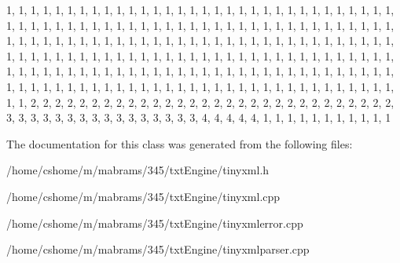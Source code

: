 \begin{DoxyCode}
 {
    
    1,  1,      1,      1,      1,      1,      1,      1,      1,      1,      
      1,       1,      1,      1,      1,      1,      
    1,  1,      1,      1,      1,      1,      1,      1,      1,      1,      
      1,       1,      1,      1,      1,      1,      
    1,  1,      1,      1,      1,      1,      1,      1,      1,      1,      
      1,       1,      1,      1,      1,      1,      
    1,  1,      1,      1,      1,      1,      1,      1,      1,      1,      
      1,       1,      1,      1,      1,      1,      
    1,  1,      1,      1,      1,      1,      1,      1,      1,      1,      
      1,       1,      1,      1,      1,      1,      
    1,  1,      1,      1,      1,      1,      1,      1,      1,      1,      
      1,       1,      1,      1,      1,      1,      
    1,  1,      1,      1,      1,      1,      1,      1,      1,      1,      
      1,       1,      1,      1,      1,      1,      
    1,  1,      1,      1,      1,      1,      1,      1,      1,      1,      
      1,       1,      1,      1,      1,      1,      
    1,  1,      1,      1,      1,      1,      1,      1,      1,      1,      
      1,       1,      1,      1,      1,      1,      
    1,  1,      1,      1,      1,      1,      1,      1,      1,      1,      
      1,       1,      1,      1,      1,      1,      
    1,  1,      1,      1,      1,      1,      1,      1,      1,      1,      
      1,       1,      1,      1,      1,      1,      
    1,  1,      1,      1,      1,      1,      1,      1,      1,      1,      
      1,       1,      1,      1,      1,      1,      
    1,  1,      2,      2,      2,      2,      2,      2,      2,      2,      
      2,       2,      2,      2,      2,      2,      
    2,  2,      2,      2,      2,      2,      2,      2,      2,      2,      
      2,       2,      2,      2,      2,      2,      
    3,  3,      3,      3,      3,      3,      3,      3,      3,      3,      
      3,       3,      3,      3,      3,      3,      
    4,  4,      4,      4,      4,      1,      1,      1,      1,      1,      
      1,       1,      1,      1,      1,      1       
    }
\end{DoxyCode}


\-The documentation for this class was generated from the following files\-:\begin{DoxyCompactItemize}
\item 
/home/cshome/m/mabrams/345/txt\-Engine/tinyxml.\-h\item 
/home/cshome/m/mabrams/345/txt\-Engine/tinyxml.\-cpp\item 
/home/cshome/m/mabrams/345/txt\-Engine/tinyxmlerror.\-cpp\item 
/home/cshome/m/mabrams/345/txt\-Engine/tinyxmlparser.\-cpp\end{DoxyCompactItemize}

